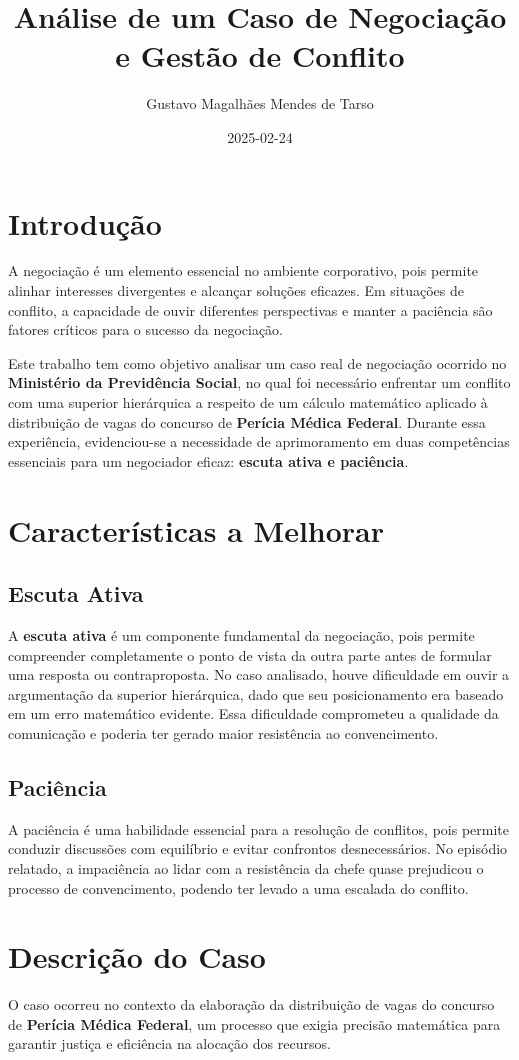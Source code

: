 \documentclass[11pt]{article}
\author{Gustavo Magalhães Mendes de Tarso}
\date{2025-02-24}
\title{Análise de um Caso de Negociação e Gestão de Conflito}
\begin{document}
\maketitle
\section*{Introdução}
\label{sec:org23d1c2d}
A negociação é um elemento essencial no ambiente corporativo, pois permite alinhar interesses divergentes e alcançar soluções eficazes. Em situações de conflito, a capacidade de ouvir diferentes perspectivas e manter a paciência são fatores críticos para o sucesso da negociação.

Este trabalho tem como objetivo analisar um caso real de negociação ocorrido no \textbf{Ministério da Previdência Social}, no qual foi necessário enfrentar um conflito com uma superior hierárquica a respeito de um cálculo matemático aplicado à distribuição de vagas do concurso de \textbf{Perícia Médica Federal}. Durante essa experiência, evidenciou-se a necessidade de aprimoramento em duas competências essenciais para um negociador eficaz: \textbf{escuta ativa e paciência}.
\section*{Características a Melhorar}
\label{sec:orgd966ba3}
\subsection*{Escuta Ativa}
\label{sec:org5db2ed2}
A \textbf{escuta ativa} é um componente fundamental da negociação, pois permite compreender completamente o ponto de vista da outra parte antes de formular uma resposta ou contraproposta. No caso analisado, houve dificuldade em ouvir a argumentação da superior hierárquica, dado que seu posicionamento era baseado em um erro matemático evidente. Essa dificuldade comprometeu a qualidade da comunicação e poderia ter gerado maior resistência ao convencimento.
\subsection*{Paciência}
\label{sec:orgbcd8360}
A paciência é uma habilidade essencial para a resolução de conflitos, pois permite conduzir discussões com equilíbrio e evitar confrontos desnecessários. No episódio relatado, a impaciência ao lidar com a resistência da chefe quase prejudicou o processo de convencimento, podendo ter levado a uma escalada do conflito.
\section*{Descrição do Caso}
\label{sec:org9c978e8}
O caso ocorreu no contexto da elaboração da distribuição de vagas do concurso de \textbf{Perícia Médica Federal}, um processo que exigia precisão matemática para garantir justiça e eficiência na alocação dos recursos.
\end{document}
